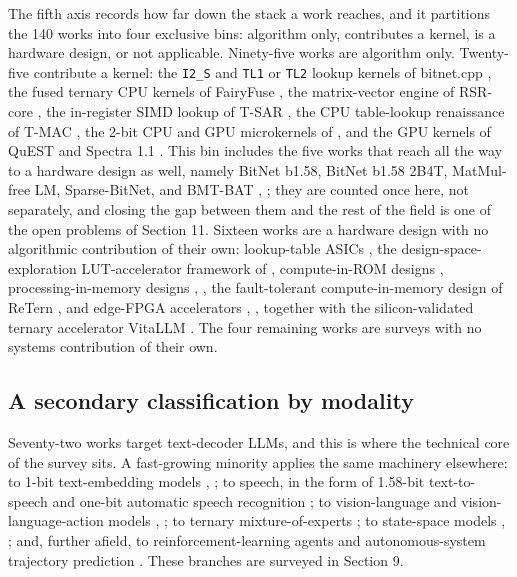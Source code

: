\documentclass[11pt]{article}
\begin{document}
The fifth axis records how far down the stack a work reaches, and it partitions the 140
works into four exclusive bins: algorithm only, contributes a kernel, is a
hardware design, or not applicable. Ninety-five works are algorithm only. Twenty-five
contribute a kernel: the \texttt{I2\_S} and \texttt{TL1} or
\texttt{TL2} lookup kernels of bitnet.cpp \cite{Wang2024-1bitAIInfra,Wang2025-BitNetCPP}, the fused
ternary CPU kernels of FairyFuse \cite{Zuo2026-FairyFuse}, the matrix-vector engine of
RSR-core \cite{Dehghankar2026-RSRcore}, the in-register SIMD lookup of T-SAR \cite{Oh2025-TSAR},
the CPU table-lookup renaissance of T-MAC \cite{Wei2024-TMAC}, the 2-bit CPU and GPU
microkernels of \cite{Georganas2025-UltraLowBitKernels}, and the GPU kernels of QuEST and
Spectra 1.1 \cite{Panferov2025-QuEST,Vaidhya2025-Spectra11}. This bin includes the five
works that reach all the way to a hardware design as well, namely BitNet b1.58, BitNet
b1.58 2B4T, MatMul-free LM, Sparse-BitNet, and BMT-BAT \cite{Ma2024-BitNetB158},
\cite{Ma2025-BitNet2B4T,Zhu2024-MatmulFree,Zhang2026-SparseBitNet,Ji2024-BMTBAT};
they are counted once here, not separately, and closing the gap between them and the
rest of the field is one of the open problems of Section 11. Sixteen works are a
hardware design with no algorithmic contribution of their own:
lookup-table ASICs \cite{Shan2025-Platinum,Anon2025-TENET}, the design-space-exploration
LUT-accelerator framework of \cite{Geens2026-LUTAccelDesign}, compute-in-ROM designs
\cite{Zhang2025-BitROM,Guan2026-TOM}, processing-in-memory designs \cite{Malekar2025-PIMLLM},
\cite{Ortega2024-PIMAI}, the fault-tolerant compute-in-memory design of ReTern
\cite{Malhotra2025-ReTern}, and edge-FPGA accelerators \cite{Xu2025-TeLLMe},
\cite{Qiao2025-TeLLMev2,Chen2025-TerEffic,Zhang2025-PDSwap}, together with the
silicon-validated ternary accelerator VitaLLM \cite{Lin2026-VitaLLM}. The four remaining works are surveys
with no systems contribution of their own.

\subsection{A secondary classification by modality}

Seventy-two works target text-decoder LLMs, and this is where the technical core of the
survey sits. A fast-growing minority applies the same machinery elsewhere: to 1-bit
text-embedding models \cite{Li2026-BitNetTextEmbeddings,Chen2024-TernaryEmbedding},
\cite{Connor2025-UltraQuantisation}; to speech, in the form of 1.58-bit text-to-speech
\cite{Kawamura2025-BitTTS} and one-bit automatic speech recognition \cite{Anon2025-OneBitASR}; to
vision-language and vision-language-action models \cite{Wang2025-BitVLA},
\cite{Sundaram2024-LLaVaOLMoBitnet,Zhang2025-TernaryCLIP}; to ternary mixture-of-experts
\cite{Wang2025-MoTE}; to state-space models \cite{Tang2024-BiMamba},
\cite{Ganesaraja2026-TernaryMamba}; and, further afield, to reinforcement-learning agents
\cite{Sajid2026-BitRL} and autonomous-system trajectory prediction \cite{Kang2026-BitTP}. These
branches are surveyed in Section 9.
\end{document}
